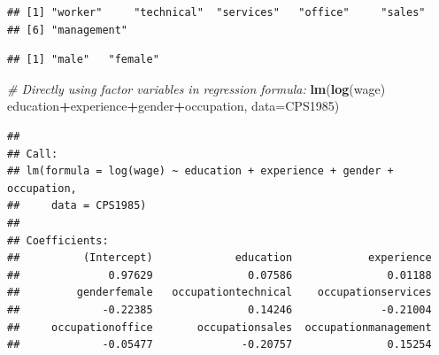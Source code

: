 \documentclass[]{book}
\newenvironment{Shaded}{\begin{snugshade}}{\end{snugshade}}
\newcommand{\CommentTok}[1]{\textcolor[rgb]{0.56,0.35,0.01}{\textit{#1}}}
\newcommand{\DataTypeTok}[1]{\textcolor[rgb]{0.13,0.29,0.53}{#1}}
\newcommand{\KeywordTok}[1]{\textcolor[rgb]{0.13,0.29,0.53}{\textbf{#1}}}
\newcommand{\NormalTok}[1]{#1}
\newcommand{\OperatorTok}[1]{\textcolor[rgb]{0.81,0.36,0.00}{\textbf{#1}}}
\newcommand{\StringTok}[1]{\textcolor[rgb]{0.31,0.60,0.02}{#1}}
\begin{document}
\begin{Shaded}
\end{Shaded}

\begin{verbatim}
## [1] "worker"     "technical"  "services"   "office"     "sales"     
## [6] "management"
\end{verbatim}

\begin{Shaded}
\end{Shaded}

\begin{verbatim}
## [1] "male"   "female"
\end{verbatim}

\begin{Shaded}
\begin{Highlighting}[]
\CommentTok{# Directly using factor variables in regression formula:}
\KeywordTok{lm}\NormalTok{(}\KeywordTok{log}\NormalTok{(wage) }\OperatorTok{~}\StringTok{ }\NormalTok{education}\OperatorTok{+}\NormalTok{experience}\OperatorTok{+}\NormalTok{gender}\OperatorTok{+}\NormalTok{occupation, }\DataTypeTok{data=}\NormalTok{CPS1985)}
\end{Highlighting}
\end{Shaded}

\begin{verbatim}
## 
## Call:
## lm(formula = log(wage) ~ education + experience + gender + occupation, 
##     data = CPS1985)
## 
## Coefficients:
##          (Intercept)             education            experience  
##              0.97629               0.07586               0.01188  
##         genderfemale   occupationtechnical    occupationservices  
##             -0.22385               0.14246              -0.21004  
##     occupationoffice       occupationsales  occupationmanagement  
##             -0.05477              -0.20757               0.15254
\end{verbatim}
\end{document}
